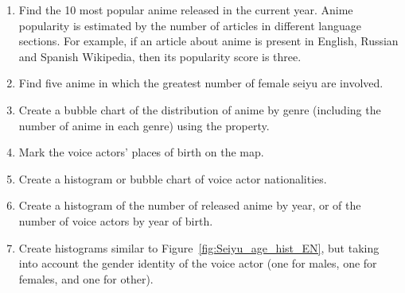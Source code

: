 \begin{enumerate}
	\item Find the \num{10} most popular anime released in the current year. Anime popularity is estimated by the number of articles in different language sections. For example, if an article about anime is present in English, Russian and Spanish Wikipedia, then its popularity score is three.
	\item Find five anime in which the greatest number of female seiyu are involved.
	\item Create a bubble chart of the distribution of anime by genre (including the number of anime in each genre) using the  property.
	\item Mark the voice actors' places of birth on the map.
	\item Create a histogram or bubble chart of voice actor nationalities.
	\item Create a histogram of the number of released anime by year, or of the number of voice actors by year of birth.
	\item Create histograms similar to Figure~\ref{fig:Seiyu_age_hist_EN}, but taking into account the gender identity of the voice actor (one for males, one for females, and one for other).
\end{enumerate}
